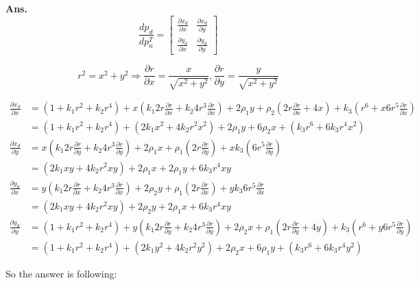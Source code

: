 \documentclass[12pt, a4paper, UTF8, fontset=windows]{ctexbook}
\newenvironment{solution}{\par\noindent\textbf{Ans.}}{\par}
\begin{document}
\begin{solution}
    $$
    \frac{dp_d}{dp_n^T}
    =
    \begin{bmatrix}
        \frac{\partial x_d}{\partial x} & \frac{\partial x_d}{\partial y} \\
        \frac{\partial y_d}{\partial x} & \frac{\partial y_d}{\partial y}
    \end{bmatrix}
    $$

    $$r^2 = x^2 + y^2 \Rightarrow \frac{\partial r}{\partial x} = \frac{x}{\sqrt{x^2 + y^2}},  \frac{\partial r}{\partial y} = \frac{y}{\sqrt{x^2 + y^2}}$$
        
    \newpage

    \begin{align*}
    \frac{\partial x_d}{\partial x} 
    &= (1 + k_1r^2 + k_2r^4) + x(k_1 2r \frac{\partial r}{\partial x} + k_2 4r^3 \frac{\partial r}{\partial x}) + 2 \rho_1y + \rho_2(2r \frac{\partial r}{\partial x} + 4x) + k_3(r^6 + x 6r^5 \frac{\partial r}{\partial x}) \\ 
    &= (1 + k_1r^2 + k_2r^4) + (2k_1x^2 + 4k_2r^2x^2) + 2\rho_1y + 6\rho_2x + (k_3r^6 + 6k_3r^4x^2) \\
    \frac{\partial x_d}{\partial y}
    &= x(k_1 2r \frac{\partial r}{\partial y} + k_2 4r^3 \frac{\partial r}{\partial y}) + 2 \rho_1 x + \rho_1(2r \frac{\partial r}{\partial y}) + xk_3(6r ^ 5 \frac{\partial r}{\partial y}) \\
    &= (2k_1xy + 4k_2r^2xy) + 2 \rho_1 x + 2\rho_1y + 6k_3r^4xy \\
    \frac{\partial y_d}{\partial x}
    &= y(k_1 2r \frac{\partial r}{\partial x} + k_2 4r^3 \frac{\partial r}{\partial x}) + 2 \rho_2 y + \rho_1(2r \frac{\partial r}{\partial x}) + yk_3 6r^5 \frac{\partial r}{\partial x} \\
    &= (2k_1 xy + 4k_2r^2xy) + 2 \rho_2 y + 2 \rho_1 x + 6k_3r^4xy \\
    \frac{\partial y_d}{\partial y}
    &= (1 + k_1r^2 + k_2r^4) + y(k_1 2r \frac{\partial r}{\partial y} + k_2 4r^3 \frac{\partial r}{\partial y}) + 2 \rho_2 x + \rho_1(2 r \frac{\partial r}{\partial y} + 4y) + k_3(r^6 + y 6r^5 \frac{\partial r}{\partial y}) \\
    &= (1 + k_1r^2 + k_2r^4) + (2k_1y^2 + 4k_2r^2y^2) + 2 \rho_2 x + 6 \rho_1 y + (k_3 r^6 + 6k_3r^4y^2)
    \end{align*}

    So the answer is following:

\end{solution}
\end{document}
